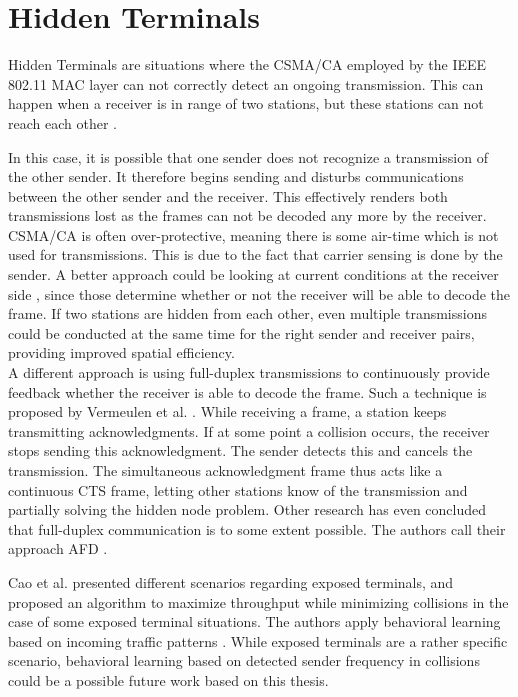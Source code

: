 
\section{Hidden Terminals}

Hidden Terminals are situations where the \gls{CSMA/CA} employed by the IEEE 802.11 \gls{MAC} layer can not correctly detect an ongoing transmission. This can happen when a receiver is in range of two stations, but these stations can not reach each other \cite{perahia2013}.

In this case, it is possible that one sender does not recognize a transmission of the other sender. It therefore begins sending and disturbs communications between the other sender and the receiver. This effectively renders both transmissions lost as the frames can not be decoded any more by the receiver.\\

\gls{CSMA/CA} is often over-protective, meaning there is some air-time which is not used for transmissions. This is due to the fact that carrier sensing is done by the sender. A better approach could be looking at current conditions at the receiver side \cite{halperin2007}, since those determine whether or not the receiver will be able to decode the frame. If two stations are hidden from each other, even multiple transmissions could be conducted at the same time for the right sender and receiver pairs, providing improved spatial efficiency.\\

A different approach is using full-duplex transmissions to continuously provide feedback whether the receiver is able to decode the frame. Such a technique is proposed by Vermeulen et al. \cite{vermeulen2016}. While receiving a frame, a station keeps transmitting acknowledgments. If at some point a collision occurs, the receiver stops sending this acknowledgment. The sender detects this and cancels the transmission. The simultaneous acknowledgment frame thus acts like a continuous CTS frame, letting other stations know of the transmission and partially solving the hidden node problem. Other research has even concluded that full-duplex communication is to some extent possible. The authors call their approach \gls{AFD} \cite{lv2014}.

Cao et al. presented different scenarios regarding exposed terminals, and proposed an algorithm to maximize throughput while minimizing collisions in the case of some exposed terminal situations. The authors apply behavioral learning based on incoming traffic patterns \cite{cao2009}. While exposed terminals are a rather specific scenario, behavioral learning based on detected sender frequency in collisions could be a possible future work based on this thesis.


